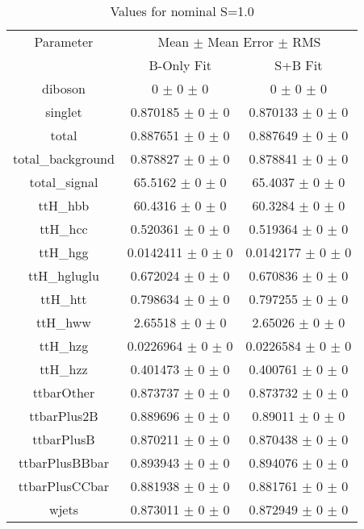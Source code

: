 \begin{table}
\centering
\caption{Values for nominal S=1.0}
\begin{tabular}{ccc}
\toprule
Parameter 	& \multicolumn{2}{c}{Mean $\pm$ Mean Error $\pm$ RMS}\\
 	& B-Only Fit & S+B Fit\\
\midrule
diboson 	& \num{0} $\pm$ \num{0} $\pm$ \num{0} 	& \num{0} $\pm$ \num{0} $\pm$ \num{0}\\
singlet 	& \num{0.870185} $\pm$ \num{0} $\pm$ \num{0} 	& \num{0.870133} $\pm$ \num{0} $\pm$ \num{0}\\
total 	& \num{0.887651} $\pm$ \num{0} $\pm$ \num{0} 	& \num{0.887649} $\pm$ \num{0} $\pm$ \num{0}\\
total\_background 	& \num{0.878827} $\pm$ \num{0} $\pm$ \num{0} 	& \num{0.878841} $\pm$ \num{0} $\pm$ \num{0}\\
total\_signal 	& \num{65.5162} $\pm$ \num{0} $\pm$ \num{0} 	& \num{65.4037} $\pm$ \num{0} $\pm$ \num{0}\\
ttH\_hbb 	& \num{60.4316} $\pm$ \num{0} $\pm$ \num{0} 	& \num{60.3284} $\pm$ \num{0} $\pm$ \num{0}\\
ttH\_hcc 	& \num{0.520361} $\pm$ \num{0} $\pm$ \num{0} 	& \num{0.519364} $\pm$ \num{0} $\pm$ \num{0}\\
ttH\_hgg 	& \num{0.0142411} $\pm$ \num{0} $\pm$ \num{0} 	& \num{0.0142177} $\pm$ \num{0} $\pm$ \num{0}\\
ttH\_hgluglu 	& \num{0.672024} $\pm$ \num{0} $\pm$ \num{0} 	& \num{0.670836} $\pm$ \num{0} $\pm$ \num{0}\\
ttH\_htt 	& \num{0.798634} $\pm$ \num{0} $\pm$ \num{0} 	& \num{0.797255} $\pm$ \num{0} $\pm$ \num{0}\\
ttH\_hww 	& \num{2.65518} $\pm$ \num{0} $\pm$ \num{0} 	& \num{2.65026} $\pm$ \num{0} $\pm$ \num{0}\\
ttH\_hzg 	& \num{0.0226964} $\pm$ \num{0} $\pm$ \num{0} 	& \num{0.0226584} $\pm$ \num{0} $\pm$ \num{0}\\
ttH\_hzz 	& \num{0.401473} $\pm$ \num{0} $\pm$ \num{0} 	& \num{0.400761} $\pm$ \num{0} $\pm$ \num{0}\\
ttbarOther 	& \num{0.873737} $\pm$ \num{0} $\pm$ \num{0} 	& \num{0.873732} $\pm$ \num{0} $\pm$ \num{0}\\
ttbarPlus2B 	& \num{0.889696} $\pm$ \num{0} $\pm$ \num{0} 	& \num{0.89011} $\pm$ \num{0} $\pm$ \num{0}\\
ttbarPlusB 	& \num{0.870211} $\pm$ \num{0} $\pm$ \num{0} 	& \num{0.870438} $\pm$ \num{0} $\pm$ \num{0}\\
ttbarPlusBBbar 	& \num{0.893943} $\pm$ \num{0} $\pm$ \num{0} 	& \num{0.894076} $\pm$ \num{0} $\pm$ \num{0}\\
ttbarPlusCCbar 	& \num{0.881938} $\pm$ \num{0} $\pm$ \num{0} 	& \num{0.881761} $\pm$ \num{0} $\pm$ \num{0}\\
wjets 	& \num{0.873011} $\pm$ \num{0} $\pm$ \num{0} 	& \num{0.872949} $\pm$ \num{0} $\pm$ \num{0}\\
\bottomrule
\end{tabular}
\end{table}